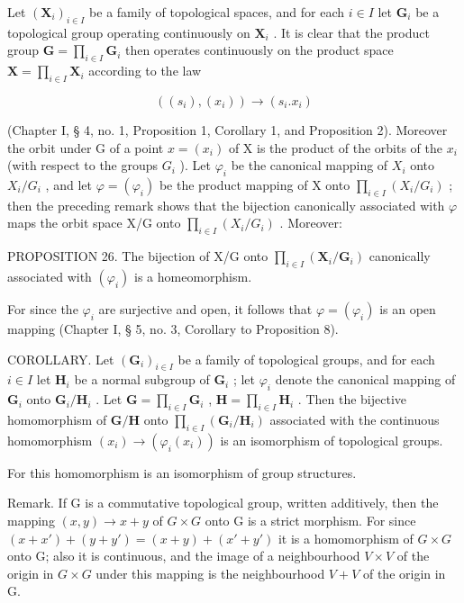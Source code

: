 Let \((\mathbf{X}_i)_{i \in I}\) be a family of topological spaces, and for each \(i \in I\) let \(\mathbf{G}_i\) be a topological group operating continuously on \(\mathbf{X}_i\) . It is clear that the product group \(\mathbf{G} = \prod_{i \in I} \mathbf{G}_i\) then operates continuously on the product space \(\mathbf{X} = \prod_{i \in I} \mathbf{X}_i\) according to the law

\[
\left(\left(s _ {i}\right), \left(x _ {i}\right)\right)\rightarrow \left(s _ {i}. x _ {i}\right)
\]

(Chapter I, § 4, no. 1, Proposition 1, Corollary 1, and Proposition 2). Moreover the orbit under G of a point \(x = (x_{i})\) of X is the product of the orbits of the \(x_{i}\) (with respect to the groups \(G_{i}\) ). Let \(\varphi_{i}\) be the canonical mapping of \(X_{i}\) onto \(X_{i}/G_{i}\) , and let \(\varphi = (\varphi_{i})\) be the product mapping of X onto \(\prod_{i\in I}(X_{i}/G_{i})\) ; then the preceding remark shows that the bijection canonically associated with \(\varphi\) maps the orbit space X/G onto \(\prod_{i\in I}(X_{i}/G_{i})\) . Moreover:

PROPOSITION 26. The bijection of X/G onto \(\prod_{i\in I}(\mathbf{X}_i / \mathbf{G}_i)\) canonically associated with \((\varphi_i)\) is a homeomorphism.

For since the \(\varphi_{i}\) are surjective and open, it follows that \(\varphi = (\varphi_{i})\) is an open mapping (Chapter I, § 5, no. 3, Corollary to Proposition 8).

COROLLARY. Let \((\mathbf{G}_{i})_{i\in I}\) be a family of topological groups, and for each \(i\in I\) let \(\mathbf{H}_i\) be a normal subgroup of \(\mathbf{G}_i\) ; let \(\varphi_i\) denote the canonical mapping of \(\mathbf{G}_i\) onto \(\mathbf{G}_i / \mathbf{H}_i\) . Let \(\mathbf{G} = \prod_{i\in I}\mathbf{G}_i\) , \(\mathbf{H} = \prod_{i\in I}\mathbf{H}_i\) . Then the bijective homomorphism of \(\mathbf{G} / \mathbf{H}\) onto \(\prod_{i\in I}(\mathbf{G}_i / \mathbf{H}_i)\) associated with the continuous homomorphism \((x_i)\to (\varphi_i(x_i))\) is an isomorphism of topological groups.

For this homomorphism is an isomorphism of group structures.

Remark. If G is a commutative topological group, written additively, then the mapping \((x,y)\to x+y\) of \(G\times G\) onto G is a strict morphism. For since \((x+x')+(y+y')=(x+y)+(x'+y')\) it is a homomorphism of \(G\times G\) onto G; also it is continuous, and the image of a neighbourhood \(V\times V\) of the origin in \(G\times G\) under this mapping is the neighbourhood \(V+V\) of the origin in G.

